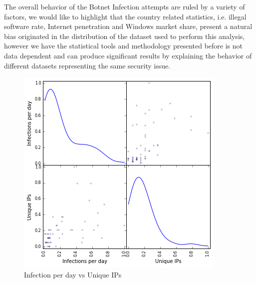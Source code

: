 The overall behavior of the Botnet Infection attempts are ruled by a variety of factors, we would like to highlight that the country related statistics, i.e. illegal software rate, Internet penetration and Windows market share, present a natural bias originated in the distribution of the dataset used to perform this analysis, however we have the statistical tools and methodology presented before is not data dependent and can produce significant results by explaining the behavior of different datasets representing the same security issue.


\begin{figure}[h]
     \caption{Infection per day vs Unique IPs}
     \label{fig:corr_1}
    \centering
    \includegraphics[width=\linewidth]{images/corr_1}
\end{figure}

